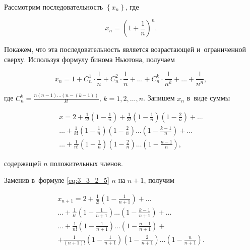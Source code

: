 
Рассмотрим последовательность $\left\{ x_{n} \right\}$, где

\begin{equation*}
\displaystyle x_{n} =
\left ( 
1 + \frac{1}{n}
\right )^{n}.
\end{equation*}

\noindent
Покажем, что эта последовательность является возрастающей и~ограниченной сверху.
Используя формулу бинома Ньютона, получаем

\begin{equation*}
\displaystyle x_{n} = 
1 +
C_{n}^{1} \cdot \frac{1}{n} +
C_{n}^{2} \cdot \frac{1}{n} +
\dots +
C_{n}^{k} \cdot \frac{1}{n^{k}} +
\dots +
\frac{1}{n^{n}},
\end{equation*}

\noindent
где 
$\displaystyle C_{n}^{k} = \frac{n(n-1) \dots \left( n - (k-1) \right)}{k!}$,
$k = 1{,} 2{,} \dots {,} n$.
Запишем $x_{n}$ в~виде суммы

\begin{multline}\label{eq:3_3_2_5}
\displaystyle x = 
2 +
\frac{1}{2!}\left( 1 - \frac{1}{n} \right) +
\frac{1}{3!}\left( 1 - \frac{1}{n} \right)\left( 1 - \frac{2}{n} \right) + \dots \\
\dots +
\frac{1}{k!}\left( 1 - \frac{1}{n} \right)\left( 1 - \frac{2}{n} \right) \dots
\left( 1 - \frac{k-1}{n} \right) + \dots \\
\dots +
\frac{1}{n!}\left(1 - \frac{1}{n} \right)\left( 1- \frac{2}{n} \right) \dots
\left( 1 - \frac{n-1}{n} \right),
\end{multline}

\noindent
содержащей $n$ положительных членов.

Заменив в~формуле \eqref{eq:3_3_2_5} $n$ на $n+1$, получим

\begin{multline}\label{eq:3_3_2_6}
\displaystyle x_{n+1} = 
2 +
\frac{1}{2!}
\left( 1 - \frac{1}{n+1} \right) + \dots \\
\dots +
\frac{1}{k!}\left( 1 - \frac{1}{n+1} \right)
\dots 
\left( 1 - \frac{k-1}{n+1} \right) + \dots \\
\dots + 
\frac{1}{n!}\left( 1 - \frac{1}{n+1} \right)
\dots
\left( 1 - \frac{n-1}{n+1} \right) + \\
+ \frac{1}{(n+1)!}\left( 1 - \frac{1}{n+1} \right)\left( 1 - \frac{2}{n+1} \right)
\dots
\left( 1 - \frac{n}{n+1} \right).
\end{multline}

